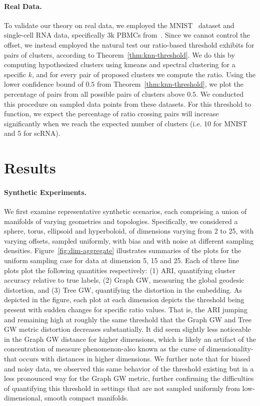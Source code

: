 \documentclass{article}
\theoremstyle{plain}
\theoremstyle{definition}
\theoremstyle{remark}
\begin{document}
\paragraph{Real Data.} To validate our theory on real data, we employed the MNIST~\cite{MNIST} dataset and single-cell RNA data, specifically 3k PBMCs from~\cite{pbmc3k_2016}. Since we cannot control the offset, we instead employed the natural test our ratio-based threshold exhibits for pairs of clusters, according to Theorem~\ref{thm:knn-threshold}. We do this by computing hypothesized clusters using kmeans and spectral clustering for a specific $k$, and for every pair of proposed clusters we compute the ratio. Using the lower confidence bound of $0.5$ from Theorem~\ref{thm:knn-threshold}, we plot the percentage of pairs from all possible pairs of clusters above $0.5$. We conducted this procedure on sampled data points from these datasets. For this threshold to function, we expect the percentage of ratio crossing pairs will increase significantly when we reach the expected number of clusters (i.e. 10 for MNIST and 5 for scRNA).

\section{Results}
\label{sec:results}

\paragraph{Synthetic Experiments.}
We first examine representative synthetic scenarios, each comprising a union of manifolds of varying geometries and topologies. Specifically, we considered a sphere, torus, ellipsoid and hyperboloid, of dimensions varying from 2 to 25, with varying offsets, sampled uniformly, with bias and with noise at different sampling densities. Figure~\ref{fig:dim-aggregate} illustrates summaries of the plots for the uniform sampling case for data at dimension 5, 15 and 25. Each of three line plots plot the following quantities respectively: (1) ARI, quantifying cluster accuracy relative to true labels, (2) Graph GW, measuring the global geodesic distortion, and (3) Tree GW, quantifying the distortion in the embedding. As depicted in the figure, each plot at each dimension depicts the threshold being present with sudden changes for specific ratio values. That is, the ARI jumping and remaining high at roughly the same threshold that the Graph GW and Tree GW metric distortion decreases substantially. It did seem slightly less noticeable in the Graph GW distance for higher dimensions, which is likely an artifact of the concentration of measure phenomenon-also known as the curse of dimensionality-that occurs with distances in higher dimensions. We further note that for biased and noisy data, we observed this same behavior of the threshold existing but in a less pronounced way for the Graph GW metric, further confirming the difficulties of quantifying this threshold in settings that are not sampled uniformly from low-dimensional, smooth compact manifolds.
\end{document}

